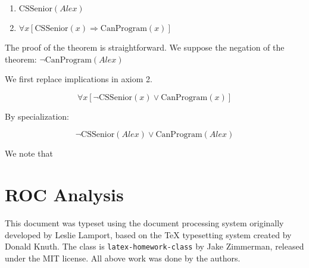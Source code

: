 \documentclass[11pt,largemargins, anonymous]{homework}
\begin{document}
\begin{enumerate}
    \item \( \mathrm{CSSenior}(Alex) \)
    \item \( \forall x [\mathrm{CSSenior}(x) \Rightarrow \mathrm{CanProgram}(x)] \)
\end{enumerate}

The proof of the theorem is straightforward.
We suppose the negation of the theorem: \( \neg \mathrm{CanProgram}(Alex) \)

We first replace implications in axiom 2.

\[ \forall x [\neg \mathrm{CSSenior}(x) \lor \mathrm{CanProgram}(x)] \]

By specialization:

\[ \neg \mathrm{CSSenior}(Alex) \lor \mathrm{CanProgram}(Alex) \]

We note that 



\part{ROC Analysis}


\begin{colophon}
    This document was typeset using the \LaTeXe{} document processing system
    originally developed by Leslie Lamport, based on the \TeX{} typesetting system
    created by Donald Knuth.
    The class is \texttt{latex-homework-class} by Jake Zimmerman,
    released under the MIT license.
    All above work was done by the authors.
\end{colophon}
\end{document}
